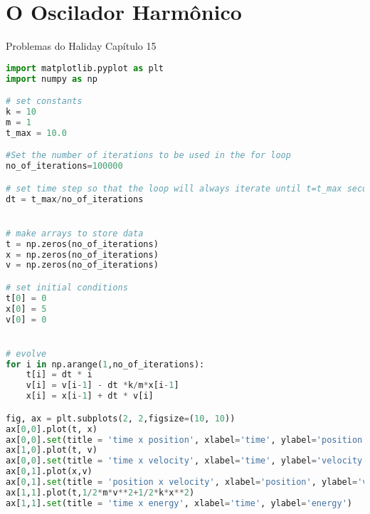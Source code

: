 \chapter{O Oscilador Harmônico}
Problemas do Haliday Capítulo 15

\begin{lstlisting}[language=Python, frame=lines, basicstyle=\footnotesize, caption={Oscilador Harmônico Simples}, label={lst:OHS}]
import matplotlib.pyplot as plt
import numpy as np

# set constants
k = 10
m = 1
t_max = 10.0

#Set the number of iterations to be used in the for loop
no_of_iterations=100000

# set time step so that the loop will always iterate until t=t_max seconds 
dt = t_max/no_of_iterations


# make arrays to store data
t = np.zeros(no_of_iterations)
x = np.zeros(no_of_iterations)
v = np.zeros(no_of_iterations)

# set initial conditions
t[0] = 0
x[0] = 5
v[0] = 0


# evolve
for i in np.arange(1,no_of_iterations):
    t[i] = dt * i
    v[i] = v[i-1] - dt *k/m*x[i-1]
    x[i] = x[i-1] + dt * v[i]

fig, ax = plt.subplots(2, 2,figsize=(10, 10))
ax[0,0].plot(t, x)
ax[0,0].set(title = 'time x position', xlabel='time', ylabel='position')
ax[1,0].plot(t, v)
ax[0,0].set(title = 'time x velocity', xlabel='time', ylabel='velocity')
ax[0,1].plot(x,v)
ax[0,1].set(title = 'position x velocity', xlabel='position', ylabel='velocity')
ax[1,1].plot(t,1/2*m*v**2+1/2*k*x**2)
ax[1,1].set(title = 'time x energy', xlabel='time', ylabel='energy')

\end{lstlisting}


